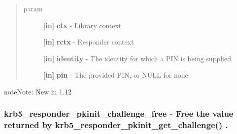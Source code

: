 \documentclass[letterpaper,10pt,english]{sphinxmanual}
\begin{document}
\begin{fulllineitems}
\label{appdev/refs/api/krb5_responder_pkinit_set_answer:krb5_responder_pkinit_set_answer}
\end{fulllineitems}

\begin{quote}\begin{description}
\item[{param}] \leavevmode
\textbf{{[}in{]}} \textbf{ctx} - Library context

\textbf{{[}in{]}} \textbf{rctx} - Responder context

\textbf{{[}in{]}} \textbf{identity} - The identity for which a PIN is being supplied

\textbf{{[}in{]}} \textbf{pin} - The provided PIN, or NULL for none

\end{description}\end{quote}

\begin{notice}{note}{Note:}
New in 1.12
\end{notice}


\subsubsection{krb5\_responder\_pkinit\_challenge\_free -  Free the value returned by krb5\_responder\_pkinit\_get\_challenge() .}
\label{appdev/refs/api/krb5_responder_pkinit_challenge_free:krb5-responder-pkinit-challenge-free-free-the-value-returned-by-krb5-responder-pkinit-get-challenge}\label{appdev/refs/api/krb5_responder_pkinit_challenge_free::doc}

\begin{fulllineitems}
\label{appdev/refs/api/krb5_responder_pkinit_challenge_free:krb5_responder_pkinit_challenge_free}
\end{fulllineitems}
\end{document}
